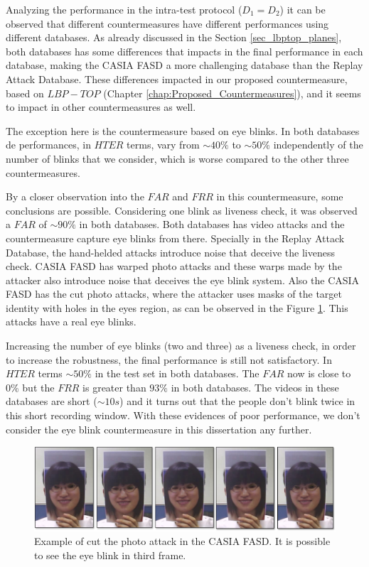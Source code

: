 Analyzing the performance in the intra-test protocol ($D_1 = D_2$) it can be observed that different countermeasures have different performances using different databases. As already discussed in the Section \ref{sec_lbptop_planes}, both databases has some differences that impacts in the final performance in each database, making the CASIA FASD a more challenging database than the Replay Attack Database. These differences impacted in our proposed countermeasure, based on $LBP-TOP$ (Chapter \ref{chap:Proposed_Countermeasures}), and it seems to impact in other countermeasures as well.

The exception here is the countermeasure based on eye blinks. In both databases de performances, in $HTER$ terms, vary from $\sim40\%$ to $\sim50\%$ independently of the number of blinks that we consider, which is worse compared to the other three countermeasures.

By a closer observation into the $FAR$ and $FRR$ in this countermeasure, some conclusions are possible. Considering one blink as liveness check, it was observed a $FAR$ of $\sim 90\%$ in both databases. Both databases has video attacks and the countermeasure capture eye blinks from there. Specially in the Replay Attack Database, the hand-helded attacks introduce noise that deceive the liveness check. CASIA FASD has warped photo attacks and these warps made by the attacker also introduce noise that deceives the eye blink system. Also the CASIA FASD has the cut photo attacks, where the attacker uses masks of the target identity with holes in the eyes region, as can be observed in the Figure \ref{fig:blink_scene}. This attacks have a real eye blinks. 

Increasing the number of eye blinks (two and three) as a liveness check, in order to increase the robustness, the final performance is still not satisfactory. In $HTER$ terms $\sim 50\%$ in the test set in both databases. The $FAR$ now is close to $0\%$ but the $FRR$ is greater than $93\%$ in both databases. The videos in these databases are short ($\sim10s$) and it turns out that the people don't blink twice in this short recording window. With these evidences of poor performance, we don't consider the eye blink countermeasure in this dissertation any further.

\begin{figure}[!btb]
\begin{center}
\includegraphics [width=15cm] {images/blink_scene.pdf}
\caption[Example of the cut photo attack in the CASIA FASD]{Example of cut the photo attack in the CASIA FASD. It is possible to see the eye blink in third frame.}
\label{fig:blink_scene}
\end{center}
\end{figure}

